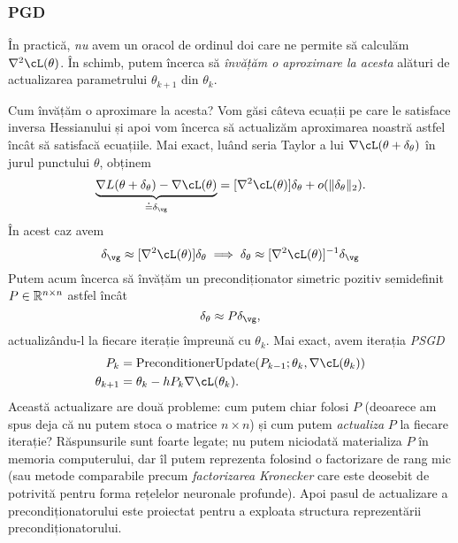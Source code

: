 \documentclass[../../book-main_ro.tex]{subfiles}
\begin{document}
\subsubsection{PGD}

În practică, \textit{nu} avem un oracol de ordinul doi care ne permite să calculăm \(\nabla^{2}\cL(\theta)\). În schimb, putem încerca să \textit{învățăm o aproximare la acesta} alături de actualizarea parametrului \(\theta_{k + 1}\) din \(\theta_{k}\).

Cum învățăm o aproximare la acesta? Vom găsi câteva ecuații pe care le satisface inversa Hessianului și apoi vom încerca să actualizăm aproximarea noastră astfel încât să satisfacă ecuațiile. Mai exact, luând seria Taylor a lui \(\nabla \cL(\theta + \delta_{\theta})\) în jurul punctului \(\theta\), obținem
\begin{equation}
    \underbrace{\nabla L(\theta + \delta_{\theta}) - \nabla \cL(\theta)}_{\doteq \delta_{\vg}} = [\nabla^{2} \cL(\theta)]\delta_{\theta} + o(\norm{\delta_{\theta}}_{2}).
\end{equation}
În acest caz avem
\begin{equation}
    \delta_{\vg} \approx [\nabla^{2}\cL(\theta)]\delta_{\theta} \implies \delta_{\theta} \approx [\nabla^{2}\cL(\theta)]^{-1}\delta_{\vg}
\end{equation}
Putem acum încerca să învățăm un precondiționator simetric pozitiv semidefinit \(P \in \mathbb{R}^{n \times n}\) astfel încât
\begin{equation}
    \delta_{\theta} \approx P\delta_{\vg},
\end{equation}
actualizându-l la fiecare iterație împreună cu \(\theta_{k}\). Mai exact, avem iterația \textit{PSGD}
\begin{align}
    P_{k}
    &= \mathrm{PreconditionerUpdate}(P_{k - 1}; \theta_{k}, \nabla \cL(\theta_{k})) \\ 
    \theta_{k + 1}
    &= \theta_{k} - hP_{k}\nabla \cL(\theta_{k}).
\end{align}
Această actualizare are două probleme: cum putem chiar folosi \(P\) (deoarece am spus deja că nu putem stoca o matrice \(n \times n\)) și cum putem \textit{actualiza} \(P\) la fiecare iterație? Răspunsurile sunt foarte legate; nu putem niciodată materializa \(P\) în memoria computerului, dar îl putem reprezenta folosind o factorizare de rang mic (sau metode comparabile precum \textit{factorizarea Kronecker} care este deosebit de potrivită pentru forma rețelelor neuronale profunde). Apoi pasul de actualizare a precondiționatorului este proiectat pentru a exploata structura reprezentării precondiționatorului.
\end{document}
